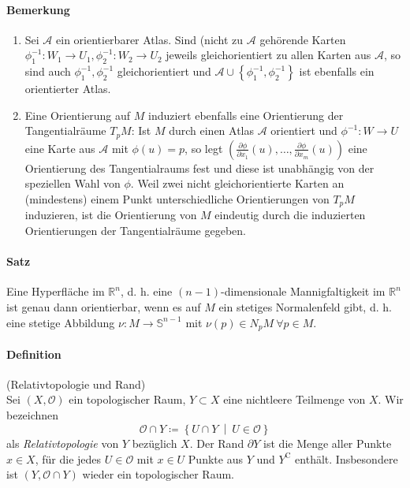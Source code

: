 \documentclass[12pt,a4paper,fleqn]{article}
\def\set#1{{\left\{ #1 \right\}}}
\def\Mid{\ \middle|\ }
\def\R{{\mathbb{R}}}
\begin{document}
\paragraph{Bemerkung}
\begin{enumerate}
\item Sei $\mathcal{A}$ ein orientierbarer Atlas. Sind (nicht zu $\mathcal{A}$ gehörende Karten $\phi^{-1}_1\colon W_1 \rightarrow U_1, \phi^{-1}_2\colon W_2 \rightarrow U_2$ jeweils gleichorientiert zu allen Karten aus $\mathcal{A}$, so sind auch $\phi_1^{-1}, \phi_2^{-1}$ gleichorientiert und $\mathcal{A} \cup \set{\phi_1^{-1}, \phi_2^{-1}}$ ist ebenfalls ein orientierter Atlas.
\item Eine Orientierung auf $M$ induziert ebenfalls eine Orientierung der Tangentialräume $T_p M$: Ist $M$ durch einen Atlas $\mathcal{A}$ orientiert und $\phi^{-1}\colon W \rightarrow U$ eine Karte aus $\mathcal{A}$ mit $\phi(u) = p$, so legt ${(\frac{\partial \phi}{\partial x_1}(u), \dots, \frac{\partial \phi}{\partial x_m}(u))}$ eine Orientierung des Tangentialraums fest und diese ist unabhängig von der speziellen Wahl von $\phi$. Weil zwei nicht gleichorientierte Karten an (mindestens) einem Punkt unterschiedliche Orientierungen von $T_p M$ induzieren, ist die Orientierung von $M$ eindeutig durch die induzierten Orientierungen der Tangentialräume gegeben.
\end{enumerate}

\paragraph{Satz} Eine Hyperfläche im $\R^n$, d. h. eine $(n - 1)$-dimensionale Mannigfaltigkeit im $\R^n$ ist genau dann orientierbar, wenn es auf $M$ ein stetiges Normalenfeld gibt, d. h. eine stetige Abbildung $\nu\colon M \rightarrow \mathbb{S}^{n-1}$ mit $\nu(p) \in N_p M\ \forall p \in M$.

\paragraph{Definition} (Relativtopologie und Rand)\\
Sei $(X, \mathcal{O})$ ein topologischer Raum, $Y \subset X$ eine nichtleere Teilmenge von $X$. Wir bezeichnen
\begin{displaymath}
\mathcal{O} \cap Y \coloneqq \set{U\cap Y \Mid U \in \mathcal{O}}
\end{displaymath}
als \textit{Relativtopologie} von $Y$ bezüglich $X$.
Der Rand $\partial Y$ ist die Menge aller Punkte $x \in X$, für die jedes $U \in \mathcal{O}$ mit $x \in U$ Punkte aus $Y$ und $Y^\mathrm{C}$ enthält. Insbesondere ist $(Y, \mathcal{O} \cap Y)$ wieder ein topologischer Raum. 
\end{document}
